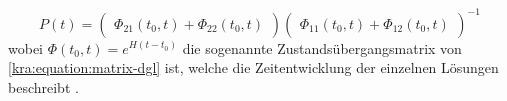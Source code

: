 \begin{equation}
    P(t) =
    \begin{pmatrix}
        \Phi_{21}(t_0, t) + \Phi_{22}(t_0, t)
    \end{pmatrix}
    \begin{pmatrix}
        \Phi_{11}(t_0, t) + \Phi_{12}(t_0, t)
    \end{pmatrix}
    ^{-1}
\end{equation}
wobei $\Phi(t_0, t) = e^{H(t - t_0)}$ die sogenannte Zustandsübergangsmatrix
von \eqref{kra:equation:matrix-dgl} ist,
welche die Zeitentwicklung der einzelnen Lösungen beschreibt
\cite{kra:kalmanisae}.

